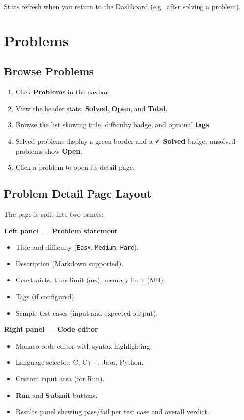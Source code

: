 \documentclass[11pt,a4paper]{article}
\begin{document}
Stats refresh when you return to the Dashboard (e.g.\ after solving a problem).

\section{Problems}

\subsection{Browse Problems}
\begin{enumerate}
  \item Click \textbf{Problems} in the navbar.
  \item View the header stats: \textbf{Solved}, \textbf{Open}, and \textbf{Total}.
  \item Browse the list showing title, difficulty badge, and optional \textbf{tags}.
  \item Solved problems display a green border and a \textbf{✓ Solved} badge; unsolved problems show \textbf{Open}.
  \item Click a problem to open its detail page.
\end{enumerate}

\subsection{Problem Detail Page Layout}
The page is split into two panels:

\textbf{Left panel --- Problem statement}
\begin{itemize}[noitemsep]
  \item Title and difficulty (\texttt{Easy}, \texttt{Medium}, \texttt{Hard}).
  \item Description (Markdown supported).
  \item Constraints, time limit (ms), memory limit (MB).
  \item Tags (if configured).
  \item Sample test cases (input and expected output).
\end{itemize}

\textbf{Right panel --- Code editor}
\begin{itemize}[noitemsep]
  \item Monaco code editor with syntax highlighting.
  \item Language selector: C, C++, Java, Python.
  \item Custom input area (for Run).
  \item \textbf{Run} and \textbf{Submit} buttons.
  \item Results panel showing pass/fail per test case and overall verdict.
\end{itemize}
\end{document}
